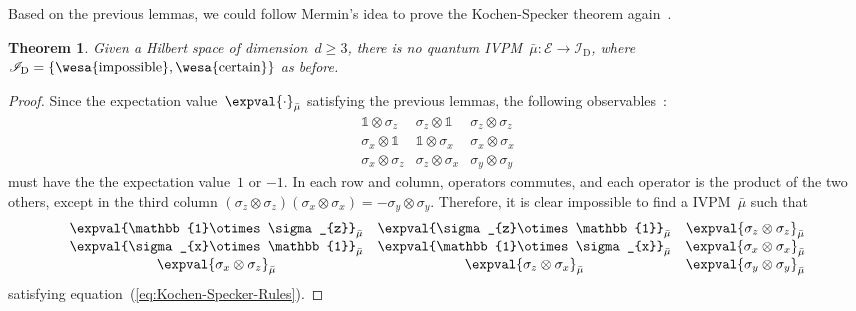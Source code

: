 \documentclass[12pt]{iopart}
\theoremstyle{plain}
\newtheorem{thm}{Theorem}
\theoremstyle{definition}
\theoremstyle{remark}
\newcommand{\events}{\ensuremath{\mathcal{E}}}
\newcommand{\imposs}{{\mbox{\wesa{impossible}}}}
\newcommand{\necess}{{\mbox{\wesa{certain}}}}
\begin{document}
Based on the previous lemmas, we could follow Mermin's idea to prove
the Kochen-Specker theorem again~\cite{Mermin1990Simple,peres1995quantum}.

\begin{thm}\label{thm:Kochen-Specker-expectation}Given a Hilbert
space of dimension~$d\ge3$, there is no quantum IVPM~$\bar{\mu}:\events\rightarrow\mathscr{I}_{\mathrm{D}}$,
where $\mathscr{I}_{\mathrm{D}}=\left\{ \imposs,\necess\right\} $
as before.\end{thm}

\begin{proof}Since the expectation value~$\expval{\cdot}_{\bar{\mu}}$
satisfying the previous lemmas, the following observables~\cite{Mermin1990Simple,peres1995quantum}:
\begin{equation}
\begin{array}{ccc}
\mathbb{1}\otimes\sigma_{z} & \sigma_{z}\otimes\mathbb{1} & \sigma_{z}\otimes\sigma_{z}\\
\sigma_{x}\otimes\mathbb{1} & \mathbb{1}\otimes\sigma_{x} & \sigma_{x}\otimes\sigma_{x}\\
\sigma_{x}\otimes\sigma_{z} & \sigma_{z}\otimes\sigma_{x} & \sigma_{y}\otimes\sigma_{y}
\end{array}\label{eq:MerminSquare}
\end{equation}
must have the the expectation value~$1$ or $-1$. In each row and
column, operators commutes, and each operator is the product of the
two others, except in the third column $\left(\sigma_{z}\otimes\sigma_{z}\right)\left(\sigma_{x}\otimes\sigma_{x}\right)=-\sigma_{y}\otimes\sigma_{y}$.
Therefore, it is clear impossible to find a IVPM~$\bar{\mu}$ such
that 
\begin{equation}
\begin{array}{ccc}
\expval{\mathbb{1}\otimes\sigma_{z}}_{\bar{\mu}} & \expval{\sigma_{z}\otimes\mathbb{1}}_{\bar{\mu}} & \expval{\sigma_{z}\otimes\sigma_{z}}_{\bar{\mu}}\\
\expval{\sigma_{x}\otimes\mathbb{1}}_{\bar{\mu}} & \expval{\mathbb{1}\otimes\sigma_{x}}_{\bar{\mu}} & \expval{\sigma_{x}\otimes\sigma_{x}}_{\bar{\mu}}\\
\expval{\sigma_{x}\otimes\sigma_{z}}_{\bar{\mu}} & \expval{\sigma_{z}\otimes\sigma_{x}}_{\bar{\mu}} & \expval{\sigma_{y}\otimes\sigma_{y}}_{\bar{\mu}}
\end{array}\label{eq:MerminSquare-values}
\end{equation}
satisfying equation~(\ref{eq:Kochen-Specker-Rules}).\end{proof}

\printbibliography
\end{document}

